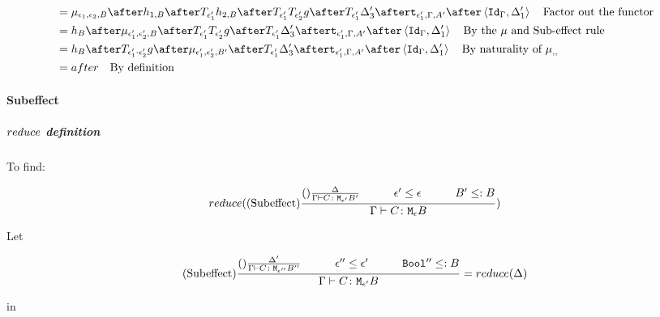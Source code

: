 {\begin{align}
                    &= \bind{\e_1}{\e_2}{B}\after 
                    h_{1, B}\after\T{\e_1'}{h_{2, B}}\after\T{\e_1'}{\T{\e_2'}{g}}\after \T{\e_1'}{\D_3'}\after
                    \tstrength{\e_1'}{\G}{A'}\after\pr{\idg}{\D_1'}\qt{Factor out the functor}\\
                    &= h_B\after\bind{\e_1'}{\e_2'}{B}\after\T{\e_1'}{\T{\e_2'}{g}}\after \T{\e_1'}{\D_3'}\after
                    \tstrength{\e_1'}{\G}{A'}\after\pr{\idg}{\D_1'}\qt{By the $\mu$ and Sub-effect rule }\\
                    & = h_B\after\T{\e_1'\dot\e_2'}{g}\after\bind{\e_1'}{\e_2'}{B'}\after \T{\e_1'}{\D_3'}\after
                    \tstrength{\e_1'}{\G}{A'}\after\pr{\idg}{\D_1'}\qt{By naturality of $\bind{}{}{}$ }\\
                    & = after \qt{By definition}
                \end{align}

            \paragraph{Subeffect}
            \subparagraph{$reduce$ definition}
            To find:

            \begin{equation}
                \reduce(\treerule{Subeffect}{\treerule{}{\D}{\gtyperelation{C}{\M{\e'}{B'}}}\s\s\e'\subeffect\e\s\s B'\subtype B}{\gtyperelation{C}{\meb}})
            \end{equation}

            Let 

            \begin{equation}
                \treerule{Subeffect}{
                    \treerule{}{\D'}{\gtyperelation{C}{\M{\e''}{B''}}}
                    \s\s
                    \e'' \subeffect \e'
                    \s\s
                    \B'' \subtype B
                }{
                    \gtyperelation{C}{\M{\e'}{B}}
                } = \reduce(\D)
            \end{equation}

            in

}
